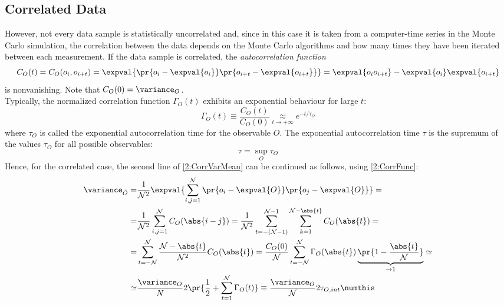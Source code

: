 \subsection{Correlated Data}
However, not every data sample is statistically uncorrelated and, since in this case it is taken from a computer-time series in the Monte Carlo simulation, the correlation between the data depends on the Monte Carlo algorithms and how many times they have been iterated between each measurement.
If the data sample is correlated, the \emph{autocorrelation function}
\begin{equation}
    C_O(t) = C_O(o_i,o_{i+t}) = \expval{\pr{o_i-\expval{o_i}}\pr{o_{i+t}-\expval{o_{i+t}}}} = \expval{o_io_{i+t}}-\expval{o_i}\expval{o_{i+t}} \label{2:CorrFunc}
\end{equation}
is nonvanishing.
Note that $C_O(0)=\variance_O$.\\
Typically, the normalized correlation function $\Gamma_O(t)$ exhibits an exponential behaviour for large $t$:
\begin{equation}
    \Gamma_O(t) \equiv \frac{C_O(t)}{C_O(0)} \underset{t\to+\infty}{\approx} e^{-t/\tau_O} \label{2:NormCorrFun}
\end{equation}
where $\tau_O$ is called the exponential autocorrelation time for the observable $O$.
The exponential autocorrelation time $\tau$ is the supremum of the values $\tau_O$ for all possible observables:
\begin{equation}
    \tau = \sup_O \tau_O \label{2:AutocorrTime}
\end{equation}
Hence, for the correlated case, the second line of \eqref{2:CorrVarMean} can be continued as follows, using \eqref{2:CorrFunc}:
\begin{align*}
    \variance_{\hat{O}} =& \frac1{\mathcal{N}^2}\expval{\sum_{i,j=1}^\mathcal{N}\pr{o_i-\expval{O}}\pr{o_j-\expval{O}}} = \\
    =& \frac1{\mathcal{N}^2} \sum_{i,j=1}^\mathcal{N} C_O(\abs{i-j}) = \frac1{\mathcal{N}^2} \sum_{t=-(\mathcal{N}-1)}^{\mathcal{N}-1}\sum_{k=1}^{\mathcal{N}-\abs{t}}C_O(\abs{t}) = \\
    =& \sum_{t=-\mathcal{N}}^\mathcal{N} \frac{\mathcal{N}-\abs{t}}{\mathcal{N}^2}C_O(\abs{t}) = \frac{C_O(0)}{\mathcal{N}}\sum_{t=-\mathcal{N}}^\mathcal{N} \Gamma_O(\abs{t})\underbrace{\pr{1-\frac{\abs{t}}{\mathcal{N}}}}_{\to1} \simeq \\
    \simeq& \frac{\variance_O}{N}2\pr{\frac12+\sum_{t=1}^\mathcal{N} \Gamma_O(t)} \equiv \frac{\variance_O}{\mathcal{N}} 2 \tau_{O,int} \numthis\label{2:VarianceCorr}
\end{align*}
